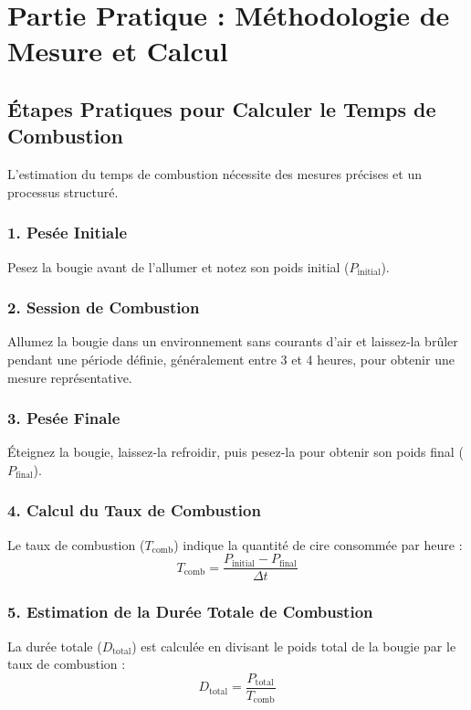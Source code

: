 \documentclass[11pt,fleqn,onecolumn,oneside]{book}
\begin{document}
\section{Partie Pratique : Méthodologie de Mesure et Calcul}

\subsection*{Étapes Pratiques pour Calculer le Temps de Combustion}

L’estimation du temps de combustion nécessite des mesures précises et un processus structuré.

\subsubsection*{1. Pesée Initiale}
Pesez la bougie avant de l’allumer et notez son poids initial (\( P_{\text{initial}} \)).

\subsubsection*{2. Session de Combustion}
Allumez la bougie dans un environnement sans courants d’air et laissez-la brûler pendant une période définie, généralement entre 3 et 4 heures, pour obtenir une mesure représentative.

\subsubsection*{3. Pesée Finale}
Éteignez la bougie, laissez-la refroidir, puis pesez-la pour obtenir son poids final (\( P_{\text{final}} \)).

\subsubsection*{4. Calcul du Taux de Combustion}
Le taux de combustion (\( T_{\text{comb}} \)) indique la quantité de cire consommée par heure :
\[
T_{\text{comb}} = \frac{P_{\text{initial}} - P_{\text{final}}}{\Delta t}
\]

\subsubsection*{5. Estimation de la Durée Totale de Combustion}
La durée totale (\( D_{\text{total}} \)) est calculée en divisant le poids total de la bougie par le taux de combustion :
\[
D_{\text{total}} = \frac{P_{\text{total}}}{T_{\text{comb}}}
\]
\end{document}
